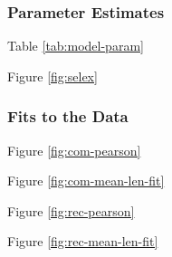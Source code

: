 \documentclass[11pt,
  english,
  a4paper,
]{article}
\begin{document}

\hypertarget{parameter-estimates}{%
\subsubsection{Parameter Estimates}\label{parameter-estimates}}

\leavevmode\tagmcend\tagstructend


Table \ref{tab:model-param}

\leavevmode\tagmcend\tagstructend\par


Figure \ref{fig:selex}

\leavevmode\tagmcend\tagstructend\par


\hypertarget{fits-to-the-data}{%
\subsubsection{Fits to the Data}\label{fits-to-the-data}}

\leavevmode\tagmcend\tagstructend


Figure \ref{fig:com-pearson}

\leavevmode\tagmcend\tagstructend\par


Figure \ref{fig:com-mean-len-fit}

\leavevmode\tagmcend\tagstructend\par


Figure \ref{fig:rec-pearson}

\leavevmode\tagmcend\tagstructend\par


Figure \ref{fig:rec-mean-len-fit}

\leavevmode\tagmcend\tagstructend\par

\end{document}
